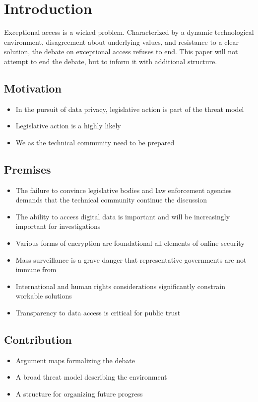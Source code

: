 \chapter{Introduction}

Exceptional access is a wicked problem. Characterized by a dynamic technological environment, disagreement about
underlying values, and resistance to a clear solution, the debate on exceptional access refuses to end. This paper will
not attempt to end the debate, but to inform it with additional structure.

\section{Motivation}

\begin{itemize}
    \item In the pursuit of data privacy, legislative action is part of the threat model
    \item Legislative action is a highly likely
    \item We as the technical community need to be prepared
\end{itemize}

\section{Premises}

\begin{itemize}
    \item The failure to convince legislative bodies and law enforcement agencies demands that the technical community continue the discussion
    \item The ability to access digital data is important and will be increasingly important for investigations
    \item Various forms of encryption are foundational all elements of online security
    \item Mass surveillance is a grave danger that representative governments are not immune from
    \item International and human rights considerations significantly constrain workable solutions
    \item Transparency to data access is critical for public trust
\end{itemize}

\section{Contribution}

\begin{itemize}
    \item Argument maps formalizing the debate
    \item A broad threat model describing the environment
    \item A structure for organizing future progress
\end{itemize}
